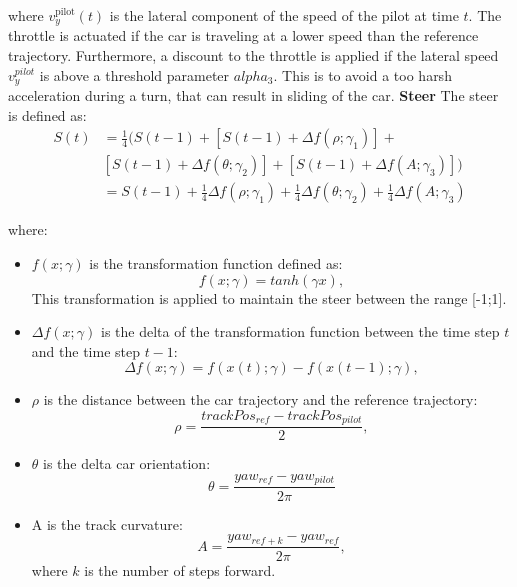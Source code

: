 where $v^{\text{pilot}}_y(t)$ is the lateral component of the speed of the pilot at time $t$.
The throttle is actuated if the car is traveling at a lower speed than the reference trajectory. Furthermore, a discount to the throttle is applied if the lateral speed $v_y^{pilot}$ is above a threshold parameter $alpha_3$. This is to avoid a too harsh acceleration during a turn, that can result in sliding of the car.
\newline  \textbf{Steer} The steer is defined as:
\begin{equation}
\begin{split}
S(t) & = 
   \frac{1}{4} \big(S(t-1)+
    [S(t-1)+\Delta f(\rho;\gamma_1)]+\\
    &[S(t-1)+\Delta f(\theta;\gamma_2)]+
    [S(t-1)+\Delta f(A;\gamma_3)] \big) \\
 & = S(t-1)+\frac{1}{4} \Delta f(\rho;\gamma_1) + \frac{1}{4} \Delta f(\theta;\gamma_2)+ \frac{1}{4} \Delta f(A;\gamma_3)
\end{split}
\end{equation}


where:
\begin{itemize}
    \item $f(x;\gamma)$ is the transformation function defined as:
\begin{equation}f(x;\gamma)=tanh(\gamma x),\end{equation}
This transformation is applied to maintain the steer between the range [-1;1].
\item $\Delta f(x;\gamma)$ is the delta of the transformation function between the time step $t$ and the time step $t-1$:
\begin{equation}\Delta f(x;\gamma)=f(x(t);\gamma)-f(x(t-1);\gamma),\end{equation}
\item $\rho$ is the distance between the car trajectory and the reference trajectory:
\begin{equation}\rho=\frac{trackPos_{ref}-trackPos_{pilot}}{2},\end{equation}
\item $\theta$ is the delta car orientation:
\begin{equation}
    \theta = \frac{yaw_{ref}-yaw_{pilot}}{2\pi}
\end{equation}
\item A is the track curvature:
\begin{equation}A=\frac{yaw_{ref+k}-yaw_{ref}}{2\pi},\end{equation}
where $k$ is the number of steps forward.
\end{itemize}

